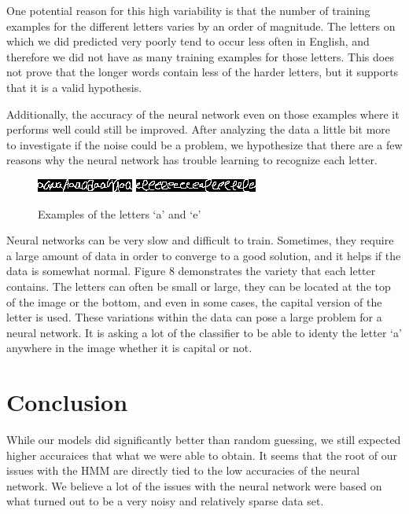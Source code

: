\documentclass[11pt,a4paper,twocolumn]{article}
\begin{document}
One potential reason for this high variability is that the number of training examples for the
different letters varies by an order of magnitude. The letters on which we did predicted very poorly
tend to occur less often in English, and therefore we did not have as many training examples for
those letters. This does not prove that the longer words contain less of the harder letters, but it
supports that it is a valid hypothesis. 

Additionally, the accuracy of the neural network even on those examples where
it performs well could still be improved. After analyzing the data a little bit
more to investigate if the noise could be a problem, we hypothesize that there
are a few reasons why the neural network has trouble learning to recognize each
letter. 

\begin{figure}[h]
\centering
\caption{Examples of the letters `a' and `e'}
\includegraphics[scale=1.0]{img/aa.jpg}
\includegraphics[scale=1.0]{img/ee.jpg}
\end{figure}

Neural networks can be very slow and difficult to train. Sometimes, they
require a large amount of data in order to converge to a good solution, and it
helps if the data is somewhat normal. Figure 8 demonstrates the variety that
each letter contains. The letters can often be small or large, they can be
located at the top of the image or the bottom, and even in some cases, the
capital version of the letter is used. These variations within the data can
pose a large problem for a neural network. It is asking a lot of the classifier
to be able to identy the letter `a' anywhere in the image whether it is capital
or not.

\section{Conclusion}

While our models did significantly better than random guessing, we still expected higher accuraices
that what we were able to obtain. It seems that the root of our issues with the HMM are directly
tied to the low accuracies of the neural network. We believe a lot of the issues with the neural
network were based on what turned out to be a very noisy and relatively sparse data set. 
\end{document}
